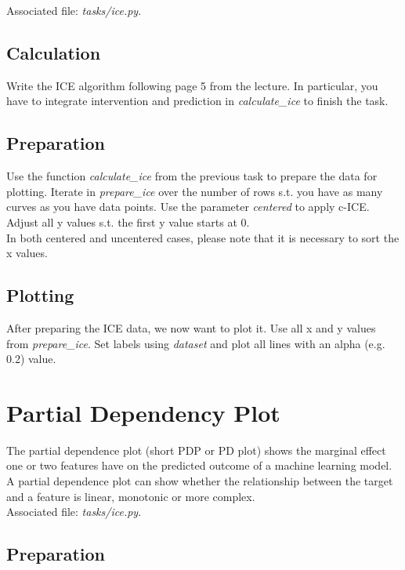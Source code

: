 \documentclass[a4paper]{article}
\begin{document}
\noindent Associated file: \textit{tasks/ice.py}.

\subsection{Calculation}

\noindent Write the ICE algorithm following page 5 from the lecture. In particular, you have to integrate intervention and prediction in \textit{calculate\_ice} to finish the task.


\subsection{Preparation}

\noindent Use the function \textit{calculate\_ice} from the previous task to prepare the data for plotting. Iterate in \textit{prepare\_ice} over the number of rows s.t. you have as many curves as you have data points. Use the parameter \textit{centered} to apply c-ICE. Adjust all y values s.t. the first y value starts at 0.\\

\noindent In both centered and uncentered cases, please note that it is necessary to sort the x values.

\subsection{Plotting}

\noindent After preparing the ICE data, we now want to plot it. Use all x and y values from \textit{prepare\_ice}. Set labels using \textit{dataset} and plot all lines with an alpha (e.g. 0.2) value.


\section{Partial Dependency Plot}

The partial dependence plot (short PDP or PD plot) shows the marginal effect one or two features have on the predicted outcome of a machine learning model. A partial dependence plot can show whether the relationship between the target and a feature is linear, monotonic or more complex.\\

\noindent Associated file: \textit{tasks/ice.py}.


\subsection{Preparation}
\end{document}
